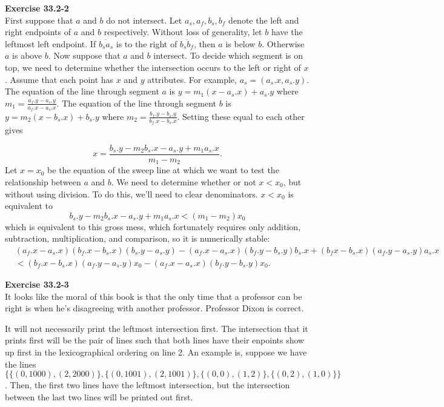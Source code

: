 \documentclass{article}
\begin{document}
\noindent\textbf{Exercise 33.2-2}\\

First suppose that $a$ and $b$ do not intersect.  Let $a_s, a_f, b_s, b_f$ denote the left and right endpoints of $a$ and $b$ respectively.  Without loss of generality, let $b$ have the leftmost left endpoint.  If $\overline{b_s a_s}$ is to the right of $\overline{b_s b_f}$, then $a$ is below $b$. Otherwise $a$ is above $b$.  Now suppose that $a$ and $b$ intersect.  To decide which segment is on top, we need to determine whether the intersection occurs to the left or right of $x$.  Assume that each point has $x$ and $y$ attributes.  For example, $a_s = (a_s.x, a_s.y)$.  The equation of the line through segment $a$ is $y = m_1(x-a_s.x) + a_s.y$ where $m_1 = \frac{a_f.y-a_s.y}{a_f.x-a_s.x}$.  The equation of the line through segment $b$ is $y = m_2(x-b_s.x) + b_s.y$ where $m_2 = \frac{b_f.y-b_s.y}{b_f.x-b_s.x}$.  Setting these equal to each other gives 

\[ x = \frac{b_s.y-m_2b_s.x - a_s.y + m_1 a_s.x}{m_1-m_2}.\]
Let $x = x_0$ be the equation of the sweep line at which we want to test the relationship between $a$ and $b$.  We need to determine whether or not $x < x_0$, but without using division.  To do this, we'll need to clear denominators.  $x < x_0$ is equivalent to 
\[b_s.y-m_2b_s.x - a_s.y + m_1 a_s.x < (m_1 - m_2)x_0\]
which is equivalent to this gross mess, which fortunately requires only addition, subtraction, multiplication, and comparison, so it is numerically stable:
\begin{align*}
&(a_f.x - a_s.x)(b_f.x-b_s.x)(b_s.y-a_s.y) - (a_f.x - a_s.x)(b_f.y-b_s.y)b_s.x + (b_fx-b_s.x)(a_f.y-a_s.y)a_s.x \\
&< (b_f.x-b_s.x)(a_f.y-a_s.y)x_0 - (a_f.x-a_s.x)(b_f.y-b_s.y)x_0.
\end{align*}


\noindent\textbf{Exercise 33.2-3}\\

It looks like the moral of this book is that the only time that a professor can be right is when he's disagreeing with another professor. Professor Dixon is correct.

It will not necessarily print the leftmost intersection first. The intersection that it prints first will be the pair of lines such that both lines have their enpoints show up first in the lexicographical ordering on line 2. An example is, suppose we have the lines $\{\{(0,1000),(2,2000)\},\{(0,1001),(2,1001)\},\{(0,0),(1,2)\},\{(0,2),(1,0)\}\}$. Then, the first two lines have the leftmost intersection, but the intersection between the last two lines will be printed out first.
\end{document}
